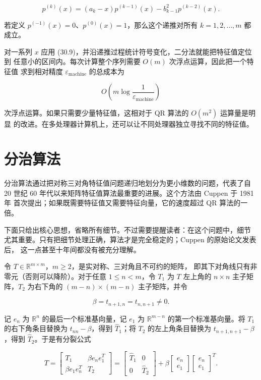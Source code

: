 \documentclass[UTF8,fontset=none,12pt]{ctexart}
\begin{document}
\begin{equation}
p^{(k)}(x)=(a_k-x)p^{(k-1)}(x)-b_{k-1}^2p^{(k-2)}(x).
\tag{30.9}
\end{equation}

若定义 $p^{(-1)}(x)=0$、$p^{(0)}(x)=1$，那么这个递推对所有
$k=1,2,\ldots,m$ 都成立。

对一系列 $x$ 应用 (30.9)，并沿递推过程统计符号变化，二分法就能把特征值定位到
任意小的区间内。每次计算整个序列需要 $O(m)$ 次浮点运算，因此把一个特征值
求到相对精度 $\varepsilon_{\mathrm{machine}}$ 的总成本为

$$
O\!\left(m\log\frac{1}{\varepsilon_{\mathrm{machine}}}\right)
$$

次浮点运算。如果只需要少量特征值，这相对于 QR 算法的 $O(m^2)$ 运算量是明显
的改进。在多处理器计算机上，还可以让不同处理器独立寻找不同的特征值。

\section*{分治算法}

分治算法通过把对称三对角特征值问题递归地划分为更小维数的问题，代表了自
20 世纪 60 年代以来矩阵特征值算法最重要的进展。这个方法由 Cuppen 于 1981 年
首次提出；如果既需要特征值又需要特征向量，它的速度超过 QR 算法的一倍。

下面只给出核心思想，省略所有细节。不过需要提醒读者：在这个问题中，细节
尤其重要。只有把细节处理正确，算法才是完全稳定的；Cuppen 的原始论文发表后，
这一点甚至十年间都没有被充分理解。

令 $T\in\mathbb{R}^{m\times m}$，$m\ge2$，是实对称、三对角且不可约的矩阵，
即其下对角线只有非零元（否则可以降阶）。对于任意 $1\le n<m$，令 $T_1$ 为
$T$ 左上角的 $n\times n$ 主子矩阵，$T_2$ 为右下角的 $(m-n)\times(m-n)$
主子矩阵，并令

$$
\beta=t_{n+1,n}=t_{n,n+1}\ne0.
$$

记 $e_n$ 为 $\mathbb{R}^n$ 的最后一个标准基向量，记 $e_1$ 为
$\mathbb{R}^{m-n}$ 的第一个标准基向量。将 $T_1$ 的右下角条目替换为
$t_{nn}-\beta$，得到 $\widehat T_1$；将 $T_2$ 的左上角条目替换为
$t_{n+1,n+1}-\beta$，得到 $\widehat T_2$。于是有分裂公式

\begin{equation}
T=
\begin{bmatrix}T_1&\beta e_ne_1^T\\\beta e_1e_n^T&T_2\end{bmatrix}
=
\begin{bmatrix}\widehat T_1&0\\0&\widehat T_2\end{bmatrix}
+\beta
\begin{bmatrix}e_n\\e_1\end{bmatrix}
\begin{bmatrix}e_n\\e_1\end{bmatrix}^{T}.
\tag{30.10}
\end{equation}
\end{document}
